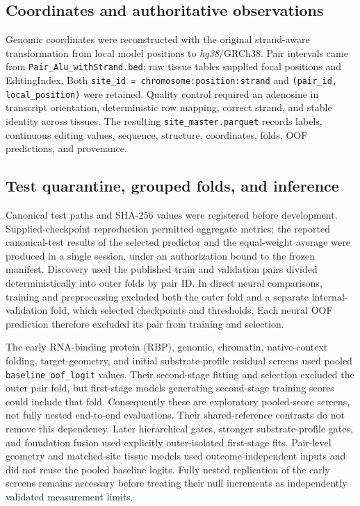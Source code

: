 \documentclass[9pt,twoside]{pnas-new}
\begin{document}
\subsection*{Coordinates and authoritative observations}

Genomic coordinates were reconstructed with the original strand-aware transformation from local model positions to \textit{hg38}/GRCh38. Pair intervals came from \texttt{Pair\_Alu\_withStrand.bed}; raw tissue tables supplied focal positions and EditingIndex. Both \texttt{site\_id = chromosome:position:strand} and \texttt{(pair\_id, local\_position)} were retained. Quality control required an adenosine in transcript orientation, deterministic row mapping, correct strand, and stable identity across tissues. The resulting \texttt{site\_master.parquet} records labels, continuous editing values, sequence, structure, coordinates, folds, OOF predictions, and provenance.

\subsection*{Test quarantine, grouped folds, and inference}

Canonical test paths and SHA-256 values were registered before development. Supplied-checkpoint reproduction permitted aggregate metrics; the reported canonical-test results of the selected predictor and the equal-weight average were produced in a single session, under an authorization bound to the frozen manifest. Discovery used the published train and validation pairs divided deterministically into \NOuterFolds{} outer folds by pair ID. In direct neural comparisons, training and preprocessing excluded both the outer fold and a separate internal-validation fold, which selected checkpoints and thresholds. Each neural OOF prediction therefore excluded its pair from training and selection.

The early RNA-binding protein (RBP), genomic, chromatin, native-context folding, target-geometry, and initial substrate-profile residual screens used pooled \texttt{baseline\_oof\_logit} values. Their second-stage fitting and selection excluded the outer pair fold, but first-stage models generating second-stage training scores could include that fold. Consequently these are exploratory pooled-score screens, not fully nested end-to-end evaluations. Their shared-reference contrasts do not remove this dependency. Later hierarchical gates, stronger substrate-profile gates, and foundation fusion used explicitly outer-isolated first-stage fits. Pair-level geometry and matched-site tissue models used outcome-independent inputs and did not reuse the pooled baseline logits. Fully nested replication of the early screens remains necessary before treating their null increments as independently validated measurement limits.
\end{document}
